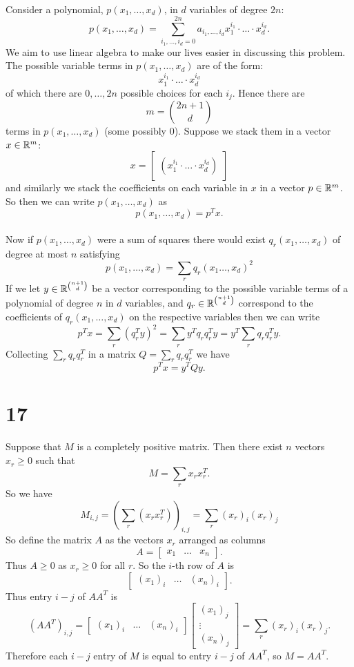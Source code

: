 \documentclass[letterpaper,12pt,oneside,onecolumn]{article}
\newcommand{\1}{\mathbbm{1}}
\begin{document}
\paragraph{}
Consider a polynomial, $p(x_1, \dots, x_d)$, in $d$ variables of degree $2n$:
$$p(x_1, \dots, x_d) = \sum_{i_1, \dots, i_d = 0}^{2n} a_{i_1, \dots, i_d} x_1^{i_1}\cdot \dots \cdot x_d^{i_d}.$$ 
We aim to use linear algebra to make our lives easier in discussing this problem. The possible variable terms in $p(x_1, \dots, x_d)$ are of the form:
$$x_1^{i_1} \cdot \dots \cdot x_d^{i_d}$$
of which there are $0, \dots, 2n$ possible choices for each $i_j$. Hence there are 
$$  m = {{2n+1}\choose{d}}$$
terms in $p(x_1, \dots, x_d)$ (some possibly $0$). Suppose we stack them in a vector $x \in \mathbb{R}^m$:
$$x = \begin{bmatrix} (x_1^{i_1} \cdot \dots \cdot x_d^{i_d}) \end{bmatrix}$$
and similarly we stack the coefficients on each variable in $x$ in a vector $p \in \mathbb{R}^m$. So then we can write $p(x_1, \dots, x_d)$ as
$$p(x_1, \dots, x_d) = p^T x.$$
\paragraph{}
Now if $p(x_1, \dots, x_d)$ were a sum of squares there would exist $q_r(x_1, \dots, x_d)$ of degree at most $n$ satisfying
$$p(x_1, \dots, x_d) = \sum_r q_r(x_1\dots, x_d)^2 $$
If we let $y \in \mathbb{R}^{n+1 \choose{d}}$ be a vector corresponding to the possible variable terms of a polynomial of degree $n$ in $d$ variables, and $q_r \in \mathbb{R}^{n+1\choose{d}}$ correspond to the coefficients of $q_r(x_1, \dots, x_d)$ on the respective variables then we can write
$$p^Tx = \sum_r (q_r^Ty)^2 = \sum_r y^T q_r q_r^T y = y^T\sum_r q_rq_r^T y.$$
Collecting $\sum_r q_rq_r^T$ in a matrix $Q = \sum_r q_r q_r^T$ we have
$$p^Tx = y^TQy.$$
\section*{17}
\paragraph{}
Suppose that $M$ is a completely positive matrix. Then there exist $n$ vectors $x_r \geq 0$ such that
$$M = \sum_r x_r x_r^T.$$
So we have
$$M_{i,j} = (\sum_r (x_rx_r^T))_{i,j} = \sum_r (x_r)_i(x_r)_j$$
So define the matrix $A$ as the vectors $x_r$ arranged as columns
$$A = \begin{bmatrix} x_1 & \dots & x_n\end{bmatrix}.$$
Thus $A \geq 0$ as $x_r \geq 0$ for all $r$. So the $i$-th row of $A$ is
$$\begin{bmatrix} (x_1)_i & \dots & (x_n)_i\end{bmatrix}.$$
Thus entry $i-j$ of $AA^T$ is 
$$(AA^T)_{i,j} = \begin{bmatrix} (x_1)_i & \dots & (x_n)_i\end{bmatrix}\begin{bmatrix} (x_1)_j \\\vdots \\ (x_n)_j \end{bmatrix} = \sum_r(x_r)_i(x_r)_j.$$
Therefore each $i-j$ entry of $M$ is equal to entry $i-j$ of $AA^T$, so $M = AA^T$. 
\end{document}
